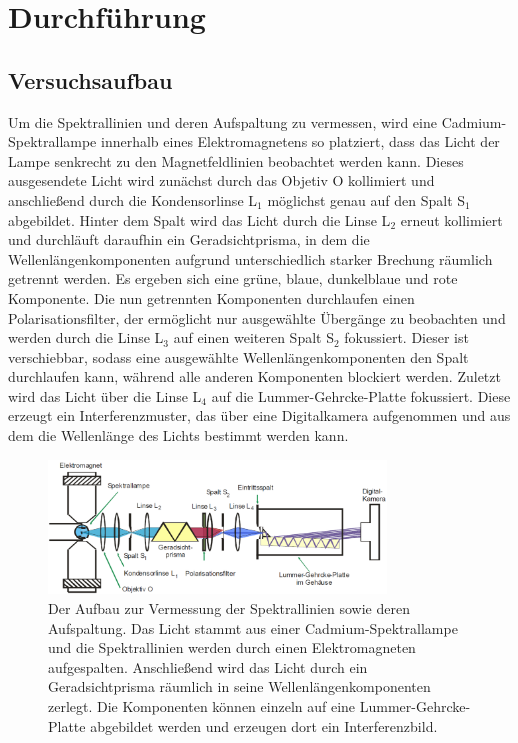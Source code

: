 \newpage
\section{Durchführung}
    \subsection{Versuchsaufbau}
        Um die Spektrallinien und deren Aufspaltung zu vermessen, wird eine Cadmium-Spektrallampe innerhalb eines Elektromagnetens so platziert, dass das Licht der Lampe senkrecht zu den Magnetfeldlinien 
        beobachtet werden kann. Dieses ausgesendete Licht wird zunächst durch das Objetiv O kollimiert und anschließend durch die Kondensorlinse L$_1$ möglichst genau auf den Spalt S$_1$ abgebildet. Hinter 
        dem Spalt wird das Licht durch die Linse L$_2$ erneut kollimiert und durchläuft daraufhin ein Geradsichtprisma, in dem die Wellenlängenkomponenten aufgrund unterschiedlich starker Brechung räumlich 
        getrennt werden. Es ergeben sich eine grüne, blaue, dunkelblaue und rote Komponente. Die nun getrennten Komponenten durchlaufen einen Polarisationsfilter, der ermöglicht nur ausgewählte Übergänge zu 
        beobachten und werden durch die Linse L$_3$ auf einen weiteren Spalt S$_2$ fokussiert. Dieser ist verschiebbar, sodass eine ausgewählte Wellenlängenkomponenten den Spalt durchlaufen kann, während alle 
        anderen Komponenten blockiert werden. Zuletzt wird das Licht über die Linse L$_4$ auf die Lummer-Gehrcke-Platte fokussiert. Diese erzeugt ein Interferenzmuster, das über eine Digitalkamera aufgenommen 
        und aus dem die Wellenlänge des Lichts bestimmt werden kann.

        \FloatBarrier

        \begin{figure}[h]
          \centering
          \includegraphics[width = 0.8\textwidth]{pictures/Aufbau.png}
          \caption{Der Aufbau zur Vermessung der Spektrallinien sowie deren Aufspaltung. Das Licht stammt aus einer Cadmium-Spektrallampe und die Spektrallinien werden durch einen Elektromagneten aufgespalten. Anschließend wird das Licht durch ein Geradsichtprisma räumlich in seine Wellenlängenkomponenten zerlegt. Die Komponenten können einzeln auf eine Lummer-Gehrcke-Platte abgebildet werden und erzeugen dort ein Interferenzbild.}
          \label{fig:Aufbau}
        \end{figure}
    
